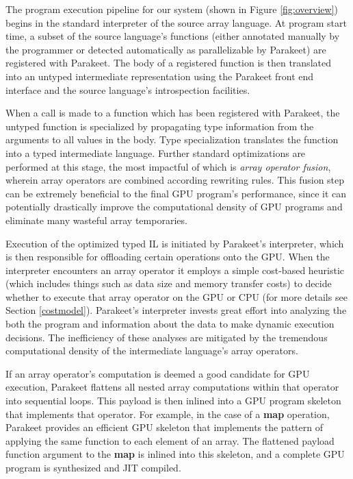 \documentclass[preprint]{sigplanconf}
\begin{document}
The program execution pipeline for our system (shown in Figure \ref{fig:overview}) begins in the standard interpreter of the source array language. At program start time, a subset of the source language's functions (either annotated manually by the programmer or detected automatically as parallelizable by Parakeet) are registered with Parakeet. The body of a registered function is then translated into an untyped intermediate representation using the Parakeet front end interface and the source language's introspection facilities.

When a call is made to a function which has been registered with Parakeet, the untyped function is specialized by propagating type information from the arguments to all values in the body.  Type specialization translates the function into a typed intermediate language. Further standard optimizations are performed at this stage, the most impactful of which is \emph{array operator fusion}, wherein array operators are combined according rewriting rules. This fusion step can be extremely beneficial to the final GPU program's performance, since it can potentially drastically improve the computational density of GPU programs and eliminate many wasteful array temporaries. 

Execution of the optimized typed IL is initiated by Parakeet's interpreter, which is then responsible for offloading certain operations onto the GPU. When the interpreter encounters an array operator it employs a simple cost-based heuristic (which includes things such as data size and memory transfer costs) to decide whether to execute that array operator on the GPU or CPU (for more details see Section \ref{costmodel}). Parakeet's interpreter invests great effort into analyzing the both the program and information about the data to make dynamic execution decisions. The inefficiency of these analyses are mitigated by the tremendous computational density of the intermediate language's array operators. 

If an array operator's computation is deemed a good candidate for GPU execution, Parakeet flattens all nested array computations within that operator into sequential loops.  This payload is then inlined into a GPU program skeleton that implements that operator.  For example, in the case of a \textbf{map} operation, Parakeet provides an efficient GPU skeleton that implements the pattern of applying the same function to each element of an array.  The flattened payload function argument to the \textbf{map} is inlined into this skeleton, and a complete GPU program is synthesized and JIT compiled.
\end{document}
